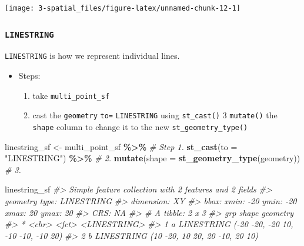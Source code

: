 \documentclass[
]{report}
\newenvironment{Shaded}{\begin{snugshade}}{\end{snugshade}}
\newcommand{\CommentTok}[1]{\textcolor[rgb]{0.56,0.35,0.01}{\textit{#1}}}
\newcommand{\DataTypeTok}[1]{\textcolor[rgb]{0.13,0.29,0.53}{#1}}
\newcommand{\KeywordTok}[1]{\textcolor[rgb]{0.13,0.29,0.53}{\textbf{#1}}}
\newcommand{\NormalTok}[1]{#1}
\newcommand{\OperatorTok}[1]{\textcolor[rgb]{0.81,0.36,0.00}{\textbf{#1}}}
\newcommand{\StringTok}[1]{\textcolor[rgb]{0.31,0.60,0.02}{#1}}
\providecommand{\tightlist}{%
  \setlength{\itemsep}{0pt}\setlength{\parskip}{0pt}}
\begin{document}
\begin{center}\texttt{[image: 3-spatial\_files/figure-latex/unnamed-chunk-12-1]} \end{center}

\hypertarget{linestring}{%
\subsubsection{\texorpdfstring{\texttt{LINESTRING}}{LINESTRING}}\label{linestring}}

\texttt{LINESTRING} is how we represent individual lines.

\begin{itemize}
\tightlist
\item
  Steps:

  \begin{enumerate}
  \def\labelenumi{\arabic{enumi}.}
  \tightlist
  \item
    take \texttt{multi\_point\_sf}
  \item
    cast the \texttt{geometry} \texttt{to=} \texttt{LINESTRING} using \texttt{st\_cast()}
    3 \texttt{mutate()} the \texttt{shape} column to change it to the new \texttt{st\_geometry\_type()}
  \end{enumerate}
\end{itemize}

\begin{Shaded}
\begin{Highlighting}[]
\NormalTok{linestring\_sf \textless{}{-}}\StringTok{ }\NormalTok{multi\_point\_sf }\OperatorTok{\%\textgreater{}\%}\StringTok{          }\CommentTok{\# Step 1.}
\StringTok{  }\KeywordTok{st\_cast}\NormalTok{(}\DataTypeTok{to =} \StringTok{"LINESTRING"}\NormalTok{) }\OperatorTok{\%\textgreater{}\%}\StringTok{             }\CommentTok{\# 2.}
\StringTok{  }\KeywordTok{mutate}\NormalTok{(}\DataTypeTok{shape =} \KeywordTok{st\_geometry\_type}\NormalTok{(geometry)) }\CommentTok{\# 3.}

\NormalTok{linestring\_sf}
\CommentTok{\#\textgreater{} Simple feature collection with 2 features and 2 fields}
\CommentTok{\#\textgreater{} geometry type:  LINESTRING}
\CommentTok{\#\textgreater{} dimension:      XY}
\CommentTok{\#\textgreater{} bbox:           xmin: {-}20 ymin: {-}20 xmax: 20 ymax: 20}
\CommentTok{\#\textgreater{} CRS:            NA}
\CommentTok{\#\textgreater{} \# A tibble: 2 x 3}
\CommentTok{\#\textgreater{}   grp   shape                                geometry}
\CommentTok{\#\textgreater{} * \textless{}chr\textgreater{} \textless{}fct\textgreater{}                            \textless{}LINESTRING\textgreater{}}
\CommentTok{\#\textgreater{} 1 a     LINESTRING ({-}20 {-}20, {-}20 10, {-}10 {-}10, {-}10 20)}
\CommentTok{\#\textgreater{} 2 b     LINESTRING     (10 {-}20, 10 20, 20 {-}10, 20 10)}
\end{Highlighting}
\end{Shaded}
\end{document}
